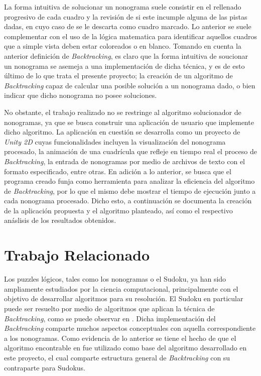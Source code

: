 \documentclass[conference]{IEEEtran}
\begin{document}
La forma intuitiva de solucionar un nonograma suele consistir en el rellenado progresivo de cada cuadro y la revisión de si este incumple alguna de las pistas dadas, en cuyo caso de se le descarta como cuadro marcado. Lo anterior se suele complementar con el uso de la lógica matematica para identificar aquellos cuadros que a simple vista deben estar coloreados o en blanco. Tomando en cuenta la anterior definición de \textit{Backtracking}, es claro que la forma intuitiva de soucionar un nonograma se asemeja a una implementación de dicha técnica, y es de esto último de lo que trata el presente proyecto; la creación de un algoritmo de \textit{Backtracking} capaz de calcular una posible solución a un nonograma dado, o bien indicar que dicho nonograma no posee soluciones. 

No obstante, el trabajo realizado no se restringe al algoritmo solucionador de nonogramas, ya que se busca construir una aplicación de usuario que implemente dicho algoritmo. La aplicación en cuestión se desarrolla como un proyecto de \textit{Unity 2D} cuyas funcionalidades incluyen la visualización del nonograma procesado, la animación de una cuadrícula que refleje en tiempo real el proceso de \textit{Backtracking}, la entrada de nonogramas por medio de archivos de texto con el formato especificado, entre otras. En adición a lo anterior, se busca que el programa creado funja como herramienta para 
analizar la eficiencia del algoritmo de \textit{Backtracking}, por lo que el mismo debe mostrar el tiempo de ejecución junto a cada nonograma procesado. Dicho esto, a continuación se documenta la creación de la aplicación propuesta y el algoritmo planteado, así como el respectivo anáslisis de los resultados obtenidos.

\section{Trabajo Relacionado}
Los puzzles lógicos, tales como los nonogramas o el Sudoku, ya han sido ampliamente estudiados por la ciencia computacional, principalmente con el objetivo de desarrollar algoritmos para su resolución. El Sudoku en particular puede ser resuelto por medio de algoritmos que aplican la técnica de \textit{Backtracking}, como se puede observar en \cite{b4}. Dicha implementación del \textit{Backtracking} comparte muchos aspectos conceptuales con aquella correspondiente a los nonogramas. Como evidencia de lo anterior se tiene el hecho de que el algoritmo encontrable en \cite{b4} fue utilizado como base del algoritmo desarrollado en este proyecto, el cual comparte estructura general de \textit{Backtracking} con su contraparte para Sudokus.
\end{document}
